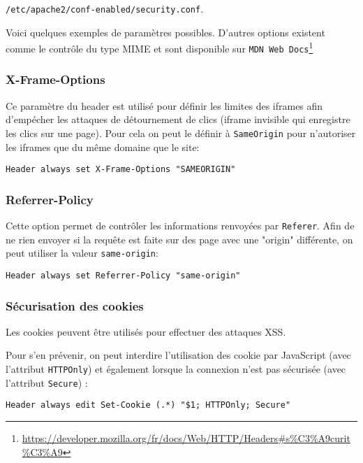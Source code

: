\texttt{/etc/apache2/conf-enabled/security.conf}. 

Voici quelques exemples de paramètres possibles. D'autres options existent comme le contrôle du type MIME et sont disponible sur \texttt{MDN Web Docs}\footnote{\url{https://developer.mozilla.org/fr/docs/Web/HTTP/Headers\#s\%C3\%A9curit\%C3\%A9}}

\subsubsection{X-Frame-Options}
Ce paramètre du header est utilisé pour définir les limites des iframes afin d'empécher les attaques de détournement de clics (iframe invisible qui enregistre les clics sur une page). Pour cela on peut le définir à \texttt{SameOrigin} pour n'autoriser les iframes que du même domaine que le site:
 
\begin{verbatim}
Header always set X-Frame-Options "SAMEORIGIN"    
\end{verbatim}
 

\subsubsection{Referrer-Policy}
Cette option permet de contrôler les informations renvoyées par \texttt{Referer}.
Afin de ne rien envoyer si la requête est faite sur des page avec une "origin" différente, on peut utiliser la valeur \texttt{same-origin}:
 
\begin{verbatim}
Header always set Referrer-Policy "same-origin"    
\end{verbatim}
 

\subsubsection{Sécurisation des cookies}
Les cookies peuvent être utilisés pour effectuer des attaques XSS.

Pour s'en prévenir, on peut interdire l'utilisation des cookie par JavaScript (avec l'attribut \texttt{HTTPOnly}) et également lorsque la connexion n'est pas sécurisée (avec l'attribut \texttt{Secure}) : 

 
\begin{verbatim}
Header always edit Set-Cookie (.*) "$1; HTTPOnly; Secure"
\end{verbatim}
 




